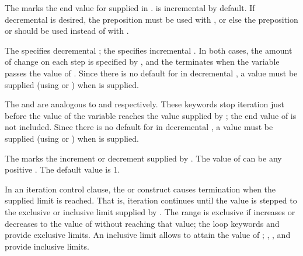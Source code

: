                                                   
The   marks the end value
for  supplied in .
 is incremental by default.
If decremental  is desired, 
the preposition  must be used with ,
or else the preposition  or  should be used instead
   of  with .
              
 
The   specifies decremental ;
the   specifies incremental .
In both cases, the amount of change on each step is specified by ,
and the  terminates when the variable  passes 
the value of .
Since there is no default for  in decremental ,
a  value must be supplied (using  or )
when  is supplied.
 
 
The   and  are analogous to
 and  respectively.  These keywords stop
iteration just before the value of the variable  reaches the value 
supplied by ; the end value of  is not included.
Since there is no default for  in decremental ,
a  value must be supplied (using  or )
when  is supplied.
 
 
The   marks the increment or decrement supplied by
.  The value of  can be any 
positive 
.
The default value is 1.
 
\endlist
 
In an iteration control clause, the  or  construct
causes termination when the supplied limit is reached.  That is,
iteration continues until the value  is stepped to the
exclusive or inclusive limit supplied by .  The range is
exclusive if  increases or decreases 
to the value of  without reaching that value; the loop
keywords  and  provide exclusive limits.  An
inclusive limit allows  to attain the value of
; , , and  provide inclusive
limits.  

